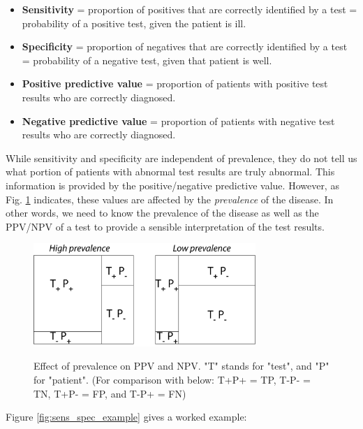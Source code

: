 \begin{itemize}
  \item \textbf{Sensitivity} = proportion of positives that are correctly identified by a test = probability of a positive test, given the patient is ill.
  \item \textbf{Specificity} = proportion of negatives that are correctly identified by a test = probability of a negative test, given that patient is well.
  \item \textbf{Positive predictive value} = proportion of patients with positive test results who are correctly diagnosed.
  \item \textbf{Negative predictive value} = proportion of patients with negative test results who are correctly diagnosed.
\end{itemize}

While sensitivity and specificity are independent of prevalence, they do not tell us what portion of patients with abnormal test results are truly abnormal. This information is provided by the positive/negative predictive value. However, as Fig. \ref{fig:prevalence} indicates, these values are affected by the \emph{prevalence}  of the disease. In other words, we need to know the prevalence of the disease as well as the PPV/NPV of a test to provide a sensible interpretation of the test results.

\begin{figure}[ht]
  \centering
  \includegraphics[width=0.75\textwidth]{../Images/Sensitivity_Specificity.png}\\
  \caption{Effect of prevalence on PPV and NPV. "T" stands for "test", and "P" for "patient". (For comparison with below: T+P+ = TP, T-P- = TN, T+P- = FP, and T-P+ = FN)} \label{fig:prevalence}
\end{figure}

Figure \ref{fig:sens_spec_example} gives a worked example:

